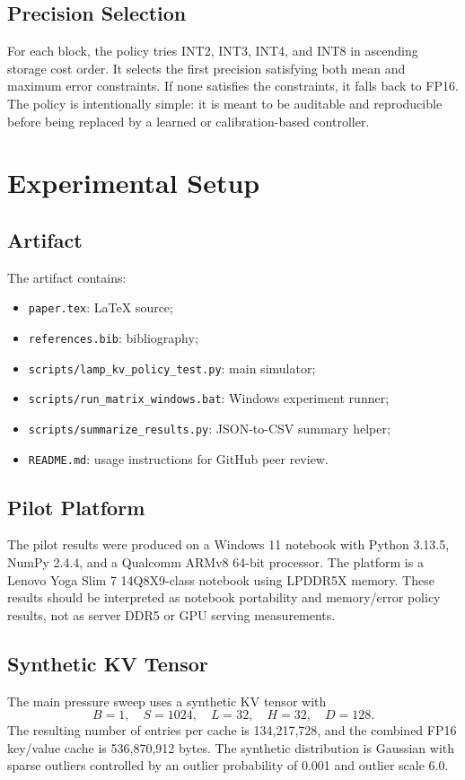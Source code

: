 \documentclass[11pt]{article}
\begin{document}
\subsection{Precision Selection}
For each block, the policy tries INT2, INT3, INT4, and INT8 in ascending storage cost order. It selects the first precision satisfying both mean and maximum error constraints. If none satisfies the constraints, it falls back to FP16. The policy is intentionally simple: it is meant to be auditable and reproducible before being replaced by a learned or calibration-based controller.

\section{Experimental Setup}
\subsection{Artifact}
The artifact contains:
\begin{itemize}
    \item \texttt{paper.tex}: LaTeX source;
    \item \texttt{references.bib}: bibliography;
    \item \texttt{scripts/lamp\_kv\_policy\_test.py}: main simulator;
    \item \texttt{scripts/run\_matrix\_windows.bat}: Windows experiment runner;
    \item \texttt{scripts/summarize\_results.py}: JSON-to-CSV summary helper;
    \item \texttt{README.md}: usage instructions for GitHub peer review.
\end{itemize}

\subsection{Pilot Platform}
The pilot results were produced on a Windows 11 notebook with Python 3.13.5, NumPy 2.4.4, and a Qualcomm ARMv8 64-bit processor. The platform is a Lenovo Yoga Slim 7 14Q8X9-class notebook using LPDDR5X memory. These results should be interpreted as notebook portability and memory/error policy results, not as server DDR5 or GPU serving measurements.

\subsection{Synthetic KV Tensor}
The main pressure sweep uses a synthetic KV tensor with
\begin{equation}
    B=1,\quad S=1024,\quad L=32,\quad H=32,\quad D=128.
\end{equation}
The resulting number of entries per cache is 134,217,728, and the combined FP16 key/value cache is 536,870,912 bytes. The synthetic distribution is Gaussian with sparse outliers controlled by an outlier probability of 0.001 and outlier scale 6.0.
\end{document}

